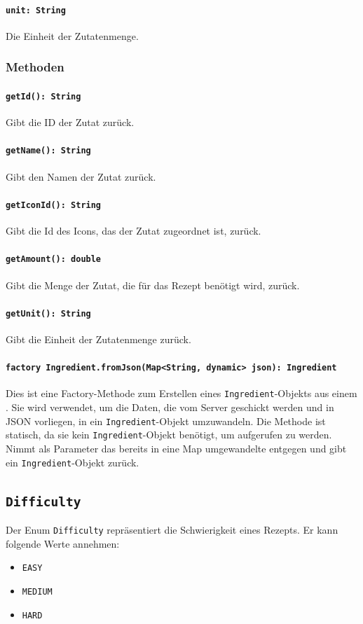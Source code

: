 \documentclass{entwurfsheft}
\begin{document}
\paragraph{\texttt{unit: String}}
Die Einheit der Zutatenmenge.

\subsubsection*{Methoden}
\paragraph{\texttt{getId(): String}}
Gibt die ID der Zutat zurück.
\paragraph{\texttt{getName(): String}}
Gibt den Namen der Zutat zurück.
\paragraph{\texttt{getIconId(): String}}
Gibt die Id des Icons, das der Zutat zugeordnet ist, zurück.
\paragraph{\texttt{getAmount(): double}}
Gibt die Menge der Zutat, die für das Rezept benötigt wird, zurück.
\paragraph{\texttt{getUnit(): String}}
Gibt die Einheit der Zutatenmenge zurück.
\paragraph{\texttt{factory Ingredient.fromJson(Map<String, dynamic> json): Ingredient}}
Dies ist eine Factory-Methode zum Erstellen eines \texttt{Ingredient}-Objekts aus einem . Sie wird verwendet, um die Daten, die vom Server geschickt werden und in \Gls{JSON} vorliegen, in ein \texttt{Ingredient}-Objekt umzuwandeln. Die Methode ist statisch, da sie kein \texttt{Ingredient}-Objekt benötigt, um aufgerufen zu werden. Nimmt als Parameter das bereits in eine Map umgewandelte  entgegen und gibt ein \texttt{Ingredient}-Objekt zurück.

\newpage
\subsection{\texttt{Difficulty}}\label{sec:difficulty}
Der Enum \texttt{Difficulty} repräsentiert die Schwierigkeit eines Rezepts. Er kann folgende Werte annehmen:
\begin{itemize}
    \item \texttt{EASY}
    \item \texttt{MEDIUM}
    \item \texttt{HARD}
\end{itemize}
\newpage
\end{document}
